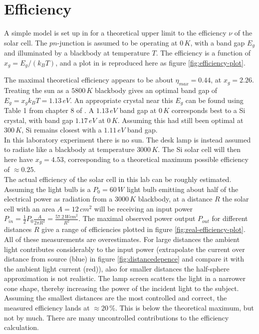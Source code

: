 \documentclass[a4paper,twoside=false,abstract=false,numbers=noenddot,
titlepage=false,headings=small,parskip=half,version=last]{scrartcl}
\begin{document}
\section{Efficiency}
A simple model is set up in \cite{lab-instruction} for a theoretical upper limit to the efficiency $\nu$ of the solar cell.
The $pn$-junction is assumed to be operating at $0\,K$, with a band gap $E_g$
and illuminated by a blackbody at temperature $T$.
The efficiency is a function of $x_g=E_g/(k_BT)$, and a plot in \cite{lab-instruction} is reproduced here as figure \ref{fig:efficiency-plot}.

The maximal theoretical efficiency appears to be about $\eta_{max}=0.44$, at $x_g=2.26$.
Treating the sun as a $5800\,K$ blackbody gives an optimal band gap of $E_g =
x_g k_B T = 1.13\,eV$.
An appropriate crystal near this $E_g$ can be found using Table 1 from chapter 8 of \cite{Kittel}.
A $1.13\,eV$ band gap at $0\,K$ corresponds best to a Si crystal, with band gap
$1.17\,eV$ at $0\,K$.
Assuming this had still been optimal at $300\,K$, Si remains closest with a
$1.11\,eV$ band gap.\\
In this laboratory experiment there is no sun. The desk lamp is instead assumed to radiate like a blackbody at temperature $3000\,K$. The Si solar cell will then here have $x_g = 4.53$, corresponding to a theoretical maximum possible efficiency of $\approx 0.25$.\\
The actual efficiency of the solar cell in this lab can be roughly estimated.
Assuming the light bulb is a $P_0=60\,W$ light bulb emitting about half of the electrical power
as radiation from a $3000\,K$ blackbody, at a distance $R$ the solar cell with an area
$A=12\,cm^2$ will be receiving an input power $P_{in} = \frac{1}{2} P_0 \frac{A}{2\pi R^2}
= \frac{57.2\,Wcm^2}{R^2}$.
The maximal observed power output $P_{out}$ for different distances $R$ give a range of efficiencies plotted in figure \ref{fig:real-efficiency-plot}.
All of these measurements are overestimates.
For large distances the ambient light contributes considerably to the input
power (extrapolate the current over distance from source (blue) in
figure \ref{fig:distancedepence} and compare it with the ambient light current (red)),
also for smaller distances the half-sphere approximation is not realistic.
The lamp screen scatters the light in a narrower cone shape, thereby increasing
the power of the incident light to the subject.\\
Assuming the smallest distances are the most controlled and correct, the measured efficiency lands at $\approx 20\,\%$.
This is below the theoretical maximum, but not by much. There are many uncontrolled contributions to the efficiency calculation.
\end{document}
